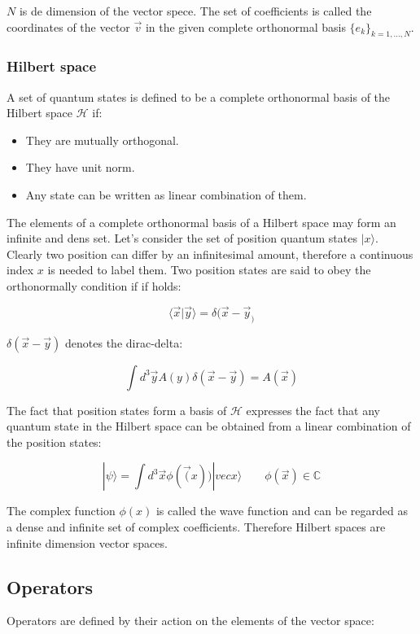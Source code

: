 		$N$ is de dimension of the vector spece.
		The set of coefficients is called the coordinates of the vector $\vec{v}$ in the given complete orthonormal basis $\{e_k\}_{k = 1, \dots, N}$.

		\subsubsection{Hilbert space}
		A set of quantum states is defined to be a complete orthonormal basis of the Hilbert space $\mathcal{H}$ if: 
		\begin{multicols}{2}
			\begin{itemize}
				\item They are mutually orthogonal.
				\item They have unit norm.
				\item Any state can be written as linear combination of them.
			\end{itemize}
		\end{multicols}

		The elements of a complete orthonormal basis of a Hilbert space may form an infinite and dens set.
		Let's consider the set of position quantum states $|x\rangle$.
		Clearly two position can differ by an infinitesimal amount, therefore a continuous index $x$ is needed to label them.
		Two position states are said to obey the orthonormally condition if if holds:

		$$\langle \vec{x}|\vec{y}\rangle = \delta(\vec{x}-\vec{y}_)$$

		$\delta(\vec{x}-\vec{y})$ denotes the dirac-delta:

		$$\int d^3\vec{y} A(y)\delta(\vec{x}-\vec{y}) = A(\vec{x})$$

		The fact that position states form a basis of $\mathcal{H}$ expresses the fact that any quantum state in the Hilbert space can be obtained from a linear combination of the position states:

		$$|\psi\rangle = \int d^3 \vec{x}\phi(\vec(x))|vec{x}\rangle\qquad \phi(\vec{x})\in\mathbb{C}$$

		The complex function $\phi(x)$ is called the wave function and can be regarded as a dense and infinite set of complex coefficients.
		Therefore Hilbert spaces are infinite dimension vector spaces.

	\subsection{Operators}
	Operators are defined by their action on the elements of the vector space:

